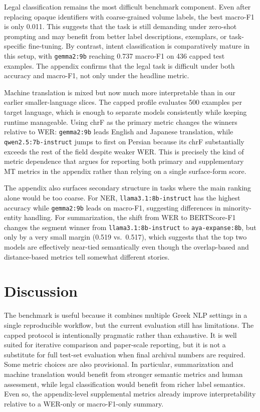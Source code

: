 \documentclass[sigconf,review,anonymous]{acmart}
\begin{document}
Legal classification remains the most difficult benchmark component. Even after replacing opaque identifiers with coarse-grained volume labels, the best macro-F1 is only 0.011. This suggests that the task is still demanding under zero-shot prompting and may benefit from better label descriptions, exemplars, or task-specific fine-tuning. By contrast, intent classification is comparatively mature in this setup, with \texttt{gemma2:9b} reaching 0.737 macro-F1 on 436 capped test examples. The appendix confirms that the legal task is difficult under both accuracy and macro-F1, not only under the headline metric.

Machine translation is mixed but now much more interpretable than in our earlier smaller-language slices. The capped profile evaluates 500 examples per target language, which is enough to separate models consistently while keeping runtime manageable. Using chrF as the primary metric changes the winners relative to WER: \texttt{gemma2:9b} leads English and Japanese translation, while \texttt{qwen2.5:7b-instruct} jumps to first on Persian because its chrF substantially exceeds the rest of the field despite weaker WER. This is precisely the kind of metric dependence that argues for reporting both primary and supplementary MT metrics in the appendix rather than relying on a single surface-form score.

The appendix also surfaces secondary structure in tasks where the main ranking alone would be too coarse. For NER, \texttt{llama3.1:8b-instruct} has the highest accuracy while \texttt{gemma2:9b} leads on macro-F1, suggesting differences in minority-entity handling. For summarization, the shift from WER to BERTScore-F1 changes the segment winner from \texttt{llama3.1:8b-instruct} to \texttt{aya-expanse:8b}, but only by a very small margin (0.519 vs.\ 0.517), which suggests that the top two models are effectively near-tied semantically even though the overlap-based and distance-based metrics tell somewhat different stories.

\section{Discussion}
The benchmark is useful because it combines multiple Greek NLP settings in a single reproducible workflow, but the current evaluation still has limitations. The capped protocol is intentionally pragmatic rather than exhaustive. It is well suited for iterative comparison and paper-scale reporting, but it is not a substitute for full test-set evaluation when final archival numbers are required. Some metric choices are also provisional. In particular, summarization and machine translation would benefit from stronger semantic metrics and human assessment, while legal classification would benefit from richer label semantics. Even so, the appendix-level supplemental metrics already improve interpretability relative to a WER-only or macro-F1-only summary.
\end{document}
